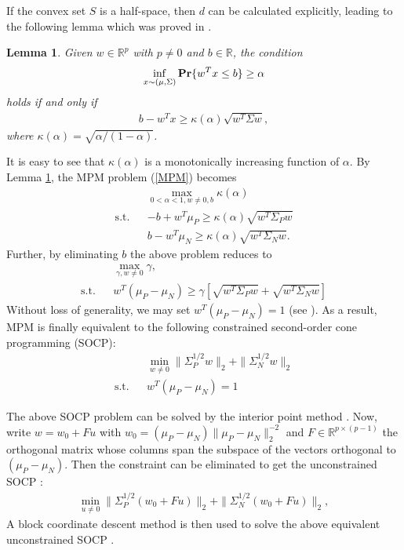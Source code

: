 \documentclass[15pt]{article}
\newcommand{\R}{{\mathbb R}}
\newcommand{\ben}{\begin{eqnarray*}}
\newcommand{\enn}{\end{eqnarray*}}
\newtheorem{lemma}{Lemma}
\begin{document}
If the convex set $S$ is a half-space, then $d$ can be calculated explicitly, leading to
the following lemma which was proved in \cite{Lanckriet2002}.

\begin{lemma}\label{Lanckriet}
Given $w\in\R^p$ with $p\neq 0$ and $b\in\R$, the condition
\ben
\inf_{x\sim(\mu,\Sigma)}{\rm\bf Pr}\{w^T x\le b\}\ge\alpha
\enn
holds if and only if
\ben
b-w^Tx\ge\kappa(\alpha)\sqrt{w^T\Sigma w},
\enn
where $\kappa(\alpha)= \sqrt{{\alpha}/({1-\alpha})}$.
\end{lemma}

It is easy to see that $\kappa(\alpha)$ is a monotonically increasing function of $\alpha$.
By Lemma \ref{Lanckriet}, the MPM problem (\ref{MPM}) becomes
\ben
&&\max_{0<\alpha<1,w\neq0,b}\kappa(\alpha) \qquad \\
\text{s.t.} && -b+w^T\mu_P\ge\kappa(\alpha)\sqrt{w^T\Sigma_P w} \\
&& b-w^T\mu_N\ge\kappa(\alpha)\sqrt{w^T\Sigma_N w}.
\enn
Further, by eliminating $b$ the above problem reduces to
\ben
&&\max_{\gamma,w\neq0}\gamma,\\
\text{s.t.}&& w^T(\mu_P-\mu_N)\ge\gamma\left[\sqrt{w^T\Sigma_P w}+\sqrt{w^T\Sigma_N w}\right]
\enn
Without loss of generality, we may set $w^T(\mu_P-\mu_N)=1$ (see \cite{Lanckriet2002}).
As a result, MPM is finally equivalent to the following constrained second-order cone programming (SOCP):
\ben\label{SOCP}
&&\min_{w\neq0}\|\Sigma_P^{1/2}w\|_2+\|\Sigma_N^{1/2}w\|_2\\
\text{s.t.}&& w^T(\mu_P-\mu_N)=1
\enn

The above SOCP problem can be solved by the interior point method \cite{Boyd2004}.
Now, write $w=w_0+Fu$ with $w_0=({\mu_P-\mu_N}){\|\mu_P-\mu_N\|_2^{-2}}$ and $F\in\R^{p\times(p-1)}$ 
the orthogonal matrix whose columns span the subspace of the vectors orthogonal to $(\mu_P-\mu_N)$. 
Then the constraint can be eliminated to get the unconstrained SOCP \cite{Lanckriet2002}:
\ben
\min_{u\neq0}\|\Sigma_P^{1/2}(w_0+F u)\|_2+\|\Sigma_N^{1/2}(w_0+F u)\|_2,
\enn
A block coordinate descent method is then used to solve the above equivalent unconstrained
SOCP \cite{Lanckriet2002}.
\end{document}
